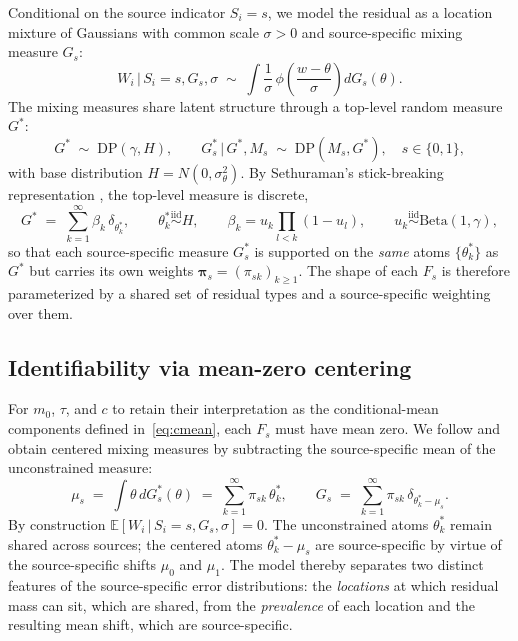 \documentclass[11pt]{article}
\newcommand{\E}{\mathbb{E}}
\newcommand{\given}{\,|\,}
\begin{document}
Conditional on the source indicator $S_i = s$, we model the residual as a location mixture of Gaussians with common scale $\sigma > 0$ and source-specific mixing measure $G_s$:
\begin{equation}
W_i \given S_i = s, G_s, \sigma \;\sim\; \int \frac{1}{\sigma}\, \phi\!\left(\frac{w - \theta}{\sigma}\right) dG_s(\theta).
\label{eq:hdp-fs}
\end{equation}
The mixing measures share latent structure through a top-level random measure $G^*$:
\begin{equation}
G^* \;\sim\; \mathrm{DP}(\gamma, H), \qquad
G_s^* \given G^*, M_s \;\sim\; \mathrm{DP}(M_s, G^*), \quad s \in \{0, 1\},
\label{eq:hdp-prior}
\end{equation}
with base distribution $H = N(0, \sigma_\theta^2)$. By Sethuraman's stick-breaking representation \citep{sethuraman1994constructive}, the top-level measure is discrete,
\begin{equation}
G^* \;=\; \sum_{k=1}^\infty \beta_k\, \delta_{\theta_k^*}, \qquad \theta_k^* \stackrel{\mathrm{iid}}{\sim} H, \qquad \beta_k = u_k \prod_{l < k}(1 - u_l), \qquad u_k \stackrel{\mathrm{iid}}{\sim} \mathrm{Beta}(1, \gamma),
\end{equation}
so that each source-specific measure $G_s^*$ is supported on the \emph{same} atoms $\{\theta_k^*\}$ as $G^*$ but carries its own weights $\bm{\pi}_s = (\pi_{sk})_{k \ge 1}$. The shape of each $F_s$ is therefore parameterized by a shared set of residual types and a source-specific weighting over them.

\subsection{Identifiability via mean-zero centering}
\label{sec:hdp-centering}

For $m_0$, $\tau$, and $c$ to retain their interpretation as the conditional-mean components defined in~\eqref{eq:cmean}, each $F_s$ must have mean zero. We follow \citet{yang2010semiparametric} and obtain centered mixing measures by subtracting the source-specific mean of the unconstrained measure:
\begin{equation}
\mu_s \;=\; \int \theta \, dG_s^*(\theta) \;=\; \sum_{k=1}^\infty \pi_{sk}\, \theta_k^*, \qquad
G_s \;=\; \sum_{k=1}^\infty \pi_{sk}\, \delta_{\theta_k^* - \mu_s}.
\label{eq:hdp-centering}
\end{equation}
By construction $\E[W_i \given S_i = s, G_s, \sigma] = 0$. The unconstrained atoms $\theta_k^*$ remain shared across sources; the centered atoms $\theta_k^* - \mu_s$ are source-specific by virtue of the source-specific shifts $\mu_0$ and $\mu_1$. The model thereby separates two distinct features of the source-specific error distributions: the \emph{locations} at which residual mass can sit, which are shared, from the \emph{prevalence} of each location and the resulting mean shift, which are source-specific.
\end{document}
